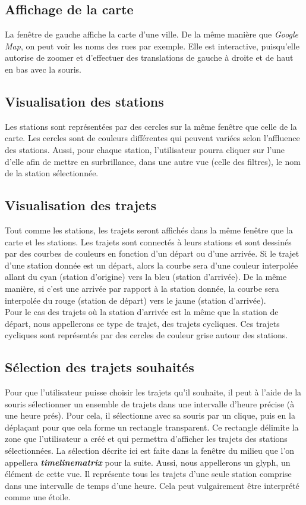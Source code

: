 \documentclass[12pt]{article}
\begin{document}
		\subsection{Affichage de la carte} \label{interactions_et_affichages}
		La fenêtre de gauche affiche la carte d'une ville. De la même manière que
		\textit{Google Map}, on peut voir les noms des rues par exemple. Elle est interactive,
		puisqu'elle autorise de zoomer et d'effectuer des translations de gauche à droite et 
		de haut en bas avec la souris.
		
		\subsection{Visualisation des stations}
		Les stations sont représentées par des cercles sur la même fenêtre que celle de la carte.
		Les cercles sont de couleurs différentes qui peuvent variées selon l'affluence des stations.
		Aussi, pour chaque station, l'utilisateur pourra cliquer sur l'une d'elle afin de mettre
		en surbrillance, dans une autre vue (celle des filtres), le nom de la station sélectionnée.
		
		\subsection{Visualisation des trajets}
		Tout comme les stations, les trajets seront affichés dans la même fenêtre que la carte et
		les stations. Les trajets sont connectés à leurs stations et sont dessinés par des courbes
		de couleurs en fonction d'un départ ou d'une arrivée. Si le trajet d'une station donnée est
		un départ, alors la courbe sera d'une couleur interpolée allant du cyan (station d'origine)
		vers la bleu (station d'arrivée). De la même manière, si c'est une arrivée par rapport à la
		station donnée, la courbe sera interpolée du rouge (station de départ) vers le jaune
		(station d'arrivée).\\
		Pour le cas des trajets où la station d'arrivée est la même que la station de départ, nous
		appellerons ce type de trajet, des trajets cycliques. Ces trajets cycliques sont représentés
		par des cercles de couleur grise autour des stations.
	
		\subsection{Sélection des trajets souhaités}
		Pour que l'utilisateur puisse choisir les trajets qu'il souhaite, il peut à l'aide de la
		souris sélectionner un ensemble de trajets dans une intervalle d'heure précise (à une
		heure prés). Pour cela, il sélectionne avec sa souris par un clique, puis en la 
		déplaçant pour que cela forme un rectangle transparent. Ce rectangle délimite la zone
		que l'utilisateur a créé et qui permettra d'afficher les trajets des stations
		sélectionnées. La sélection décrite ici est faite dans la fenêtre du milieu que l'on
		appellera \textbf{\textit{timelinematrix}} pour la suite. Aussi, nous appellerons
		un glyph, un élément de cette vue. Il représente tous les trajets d'une seule station
		comprise dans une intervalle de temps d'une heure. Cela peut vulgairement être interprété
		comme une étoile.
		
\end{document}
